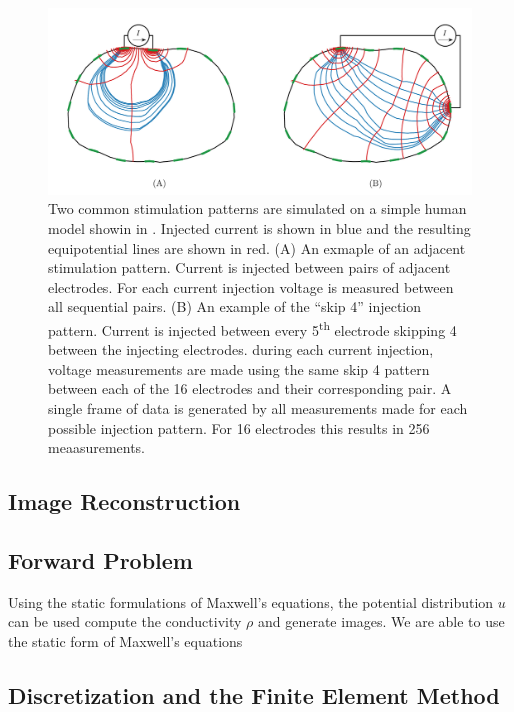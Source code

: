 \begin{figure}
    \includegraphics[width=\textwidth]{chapter2-background/imgs/common_stim_meas_patterns.pdf}
    \caption[Adjacent and "skip 4" stimulation patterns]{\label{fig:stim_meas_bkgnd} 
    Two common stimulation patterns are simulated on a simple human model showin in 
    . Injected current is shown in blue and the resulting equipotential 
    lines are shown in red.
    (A) An exmaple of an adjacent stimulation pattern. Current is injected between 
    pairs of adjacent electrodes. For each current injection voltage is 
    measured between all sequential pairs. 
    (B) An example of the ``skip 4'' injection pattern. Current is injected between every
    5\textsuperscript{th} electrode skipping 4 between the injecting electrodes. 
    during each current injection, voltage measurements are made using the same skip 4 
    pattern between each of the 16 electrodes and their corresponding pair. 
    A single frame of data is generated by all measurements made for each possible injection
    pattern. For 16 electrodes this results in 256 meaasurements.}
 \end{figure}

\subsection{Image Reconstruction}


\subsection{Forward Problem}
Using the static 
formulations of Maxwell's equations, the potential distribution $u$ can be used 
compute the conductivity $\rho$ and generate images.
We are able to use the static form of Maxwell's equations 

\subsection{Discretization and the Finite Element Method}


